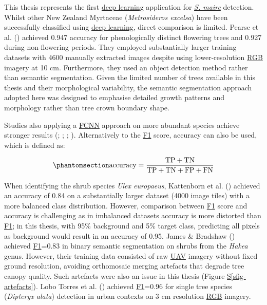 \documentclass[
]{scrreprt}
\newcommand*\quartosfigref[1]{Figure \hyperref[#1]{S\ref{#1}}}
\begin{document}
This thesis represents the first \hyperref[acronyms_DL]{deep learning}
application for \hyperref[acronyms_SM]{\emph{S. maire}} detection.
Whilst other New Zealand Myrtaceae (\emph{Metrosideros excelsa}) have
been successfully classified using \hyperref[acronyms_DL]{deep
learning}, direct comparison is limited. Pearse et al.
() achieved 0.947 accuracy
for phenologically distinct flowering trees and 0.927 during
non-flowering periods. They employed substantially larger training
datasets with 4600 manually extracted images despite using
lower-resolution \hyperref[acronyms_RGB]{RGB} imagery at 10 cm.
Furthermore, they used an object detection method rather than semantic
segmentation. Given the limited number of trees available in this thesis
and their morphological variability, the semantic segmentation approach
adopted here was designed to emphasise detailed growth patterns and
morphology rather than tree crown boundary shape.

Studies also applying a \hyperref[acronyms_FCNN]{FCNN} approach on more
abundant species achieve stronger results
(;
; ; ).
Alternatively to the \hyperref[acronyms_F1]{F1} score, accuracy can also
be used, which is defined as:

\begin{equation}\phantomsection\label{eq-accuracy}{
\text{accuracy} = \frac{\text{TP} + \text{TN}}{\text{TP} + \text{TN} + \text{FP} + \text{FN}}
}\end{equation}

When identifying the shrub species \emph{Ulex europaeus}, Kattenborn et
al. () achieved an
accuracy of 0.84 on a substantially larger dataset (4000 image tiles)
with a more balanced class distribution. However, comparison between
\hyperref[acronyms_F1]{F1} score and accuracy is challenging as in
imbalanced datasets accuracy is more distorted than
\hyperref[acronyms_F1]{F1}; in this thesis, with 95\% background and 5\%
target class, predicting all pixels as background would result in an
accuracy of 0.95. James \& Bradshaw
() achieved
\hyperref[acronyms_F1]{F1}=0.83 in binary semantic segmentation on
shrubs from the \emph{Hakea} genus. However, their training data
consisted of raw \hyperref[acronyms_UAV]{UAV} imagery without fixed
ground resolution, avoiding orthomosaic merging artefacts that degrade
tree canopy quality. Such artefacts were also an issue in this thesis
(\quartosfigref{sfig-artefacts}). Lobo Torres et al.
() achieved
\hyperref[acronyms_F1]{F1}=0.96 for single tree species (\emph{Dipteryx
alata}) detection in urban contexts on 3 cm resolution
\hyperref[acronyms_RGB]{RGB} imagery.
\end{document}
